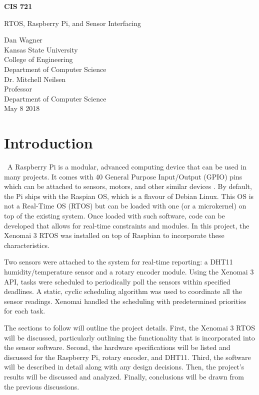\documentclass[letterpaper, 12pt]{article}
\begin{document}
	\begin{titlepage}
		\centering
		\vspace*{5.75cm}
		{\huge\bfseries CIS 721\par}
		{\large RTOS, Raspberry Pi, and Sensor Interfacing\par}
		\vspace{2cm}
		Dan Wagner\\
		Kansas State University\\
		College of Engineering\\
		Department of Computer Science\\
		\vspace{1cm}
		Dr. Mitchell Neilsen\\
		Professor\\
		Department of Computer Science\\
		\vspace{1cm}
		May 8 2018
	\end{titlepage}

\section{Introduction}
~\indent A Raspberry Pi is a modular, advanced computing device that can be used in many projects.  It comes with 40 General Purpose Input/Output (GPIO) pins which can be attached to sensors, motors, and other similar devices \cite{raspberrypifoundation2018}.  By default, the Pi ships with the Raspian OS, which is a flavour of Debian Linux.  This OS is not a Real-Time OS (RTOS) but can be loaded with one (or a microkernel) on top of the existing system.  Once loaded with such software, code can be developed that allows for real-time constraints and modules.  In this project, the Xenomai 3 RTOS was installed on top of Raspbian to incorporate these characteristics.

\indent Two sensors were attached to the system for real-time reporting: a DHT11 humidity/temperature sensor and a rotary encoder module.  Using the Xenomai 3 API, tasks were scheduled to periodically poll the sensors within specified deadlines.  A static, cyclic scheduling algorithm was used to coordinate all the sensor readings.  Xenomai handled the scheduling with predetermined priorities for each task.

The sections to follow will outline the project details.  First, the Xenomai 3 RTOS will be discussed, particularly outlining the functionality that is incorporated into the sensor software.  Second, the hardware specifications will be listed and discussed for the Raspberry Pi, rotary encoder, and DHT11.  Third, the software will be described in detail along with any design decisions.  Then, the project's results will be discussed and analyzed.  Finally, conclusions will be drawn from the previous discussions.
~\newline
\end{document}

